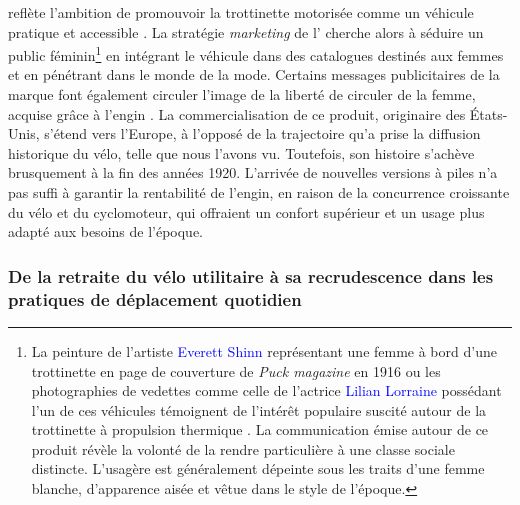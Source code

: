 \begin{refsegment}
{} reflète l’ambition de promouvoir la trottinette motorisée comme un véhicule pratique et accessible \textcolor{blue}{\autocite{smithsonian_magazine_motorized_2019}}. La stratégie \textsl{marketing} de l’ cherche alors à séduire un public féminin\footnote{
    La peinture de l'artiste \textcolor{blue}{Everett Shinn} représentant une femme à bord d'une trottinette  en page de couverture de \textsl{Puck magazine} en 1916 ou les photographies de vedettes comme celle de l'actrice \textcolor{blue}{Lilian Lorraine} possédant l'un de ces véhicules témoignent de l'intérêt populaire suscité autour de la trottinette à propulsion thermique \textcolor{blue}{\autocite{hemmings_look_2011}}. La communication émise autour de ce produit révèle la volonté de la rendre particulière à une classe sociale distincte. L’usagère est généralement dépeinte sous les traits d’une femme blanche, d’apparence aisée et vêtue dans le style de l’époque.
} en intégrant le véhicule dans des catalogues destinés aux femmes et en pénétrant dans le monde de la mode. Certains messages publicitaires de la marque font également circuler l'image de la liberté de circuler de la femme, acquise grâce à l'engin \textcolor{blue}{\autocite{smithsonian_magazine_motorized_2019}}. La commercialisation de ce produit, originaire des États-Unis, s'étend vers l’Europe, à l’opposé de la trajectoire qu’a prise la diffusion historique du vélo, telle que nous l'avons vu. Toutefois, son histoire s’achève brusquement à la fin des années 1920. L’arrivée de nouvelles versions à piles n’a pas suffi à garantir la rentabilité de l’engin, en raison de la concurrence croissante du vélo et du cyclomoteur, qui offraient un confort supérieur et un usage plus adapté aux besoins de l’époque.%

\subsubsection*{De la retraite du vélo utilitaire à sa recrudescence dans les pratiques de déplacement quotidien
    \label{chap1:proximite-velo-trottinette-declin-renaissance}
    }


\end{refsegment}
